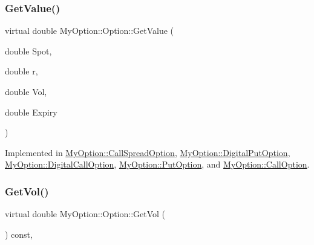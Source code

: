\hypertarget{classMyOption_1_1Option_a62422d3dc60eabe65cfa94d2a452f5f8}{}\label{classMyOption_1_1Option_a62422d3dc60eabe65cfa94d2a452f5f8} 
\subsubsection{\texorpdfstring{Get\+Value()}{GetValue()}\hspace{0.1cm}{\footnotesize\ttfamily [3/3]}}
{\footnotesize\ttfamily virtual double My\+Option\+::\+Option\+::\+Get\+Value (\begin{DoxyParamCaption}\item[{double}]{Spot,  }\item[{double}]{r,  }\item[{double}]{Vol,  }\item[{double}]{Expiry }\end{DoxyParamCaption})\hspace{0.3cm}{\ttfamily [pure virtual]}}



Implemented in \hyperlink{classMyOption_1_1CallSpreadOption_a5e88bf671572da6441db916620c5c202}{My\+Option\+::\+Call\+Spread\+Option}, \hyperlink{classMyOption_1_1DigitalPutOption_ab55e215fef7a85bb06175a05548a3f77}{My\+Option\+::\+Digital\+Put\+Option}, \hyperlink{classMyOption_1_1DigitalCallOption_a75391ad8c6b599e0c181c965d01cd610}{My\+Option\+::\+Digital\+Call\+Option}, \hyperlink{classMyOption_1_1PutOption_a997691a3e08cf0dbf148e24b8fe80dd0}{My\+Option\+::\+Put\+Option}, and \hyperlink{classMyOption_1_1CallOption_a2a3ca51422260a20ac9d151f38980df7}{My\+Option\+::\+Call\+Option}.

\hypertarget{classMyOption_1_1Option_ae039666c1ba4084374f825163dddee35}{}\label{classMyOption_1_1Option_ae039666c1ba4084374f825163dddee35} 
\subsubsection{\texorpdfstring{Get\+Vol()}{GetVol()}}
{\footnotesize\ttfamily virtual double My\+Option\+::\+Option\+::\+Get\+Vol (\begin{DoxyParamCaption}{ }\end{DoxyParamCaption}) const\hspace{0.3cm}{\ttfamily [inline]}, {\ttfamily [virtual]}}

